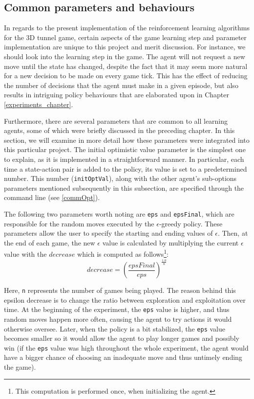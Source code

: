 \subsection{Common parameters and behaviours}
In regards to the present implementation of the reinforcement learning algorithms for the 3D tunnel game, certain aspects of the game learning step and parameter implementation are unique to this project and merit discussion. For instance, we should look into the learning step in the game. The agent will not request a new move until the state has changed, despite the fact that it may seem more natural for a new decision to be made on every game tick. This has the effect of reducing the number of decisions that the agent must make in a given episode, but also results in intriguing policy behaviours that are elaborated upon in Chapter \ref{experiments_chapter}.

Furthermore, there are several parameters that are common to all learning agents, some of which were briefly discussed in the preceding chapter. In this section, we will examine in more detail how these parameters were integrated into this particular project. The initial optimistic value parameter is the simplest one to explain, as it is implemented in a straightforward manner. In particular, each time a state-action pair is added to the policy, its value is set to a predetermined number. This number (\texttt{initOptVal}), along with the other agent's sub-options parameters mentioned subsequently in this subsection, are specified through the command line (see \ref{commOpt}).

The following two parameters worth noting are \texttt{eps} and \texttt{epsFinal}, which are responsible for the random moves executed by the $\epsilon$-greedy policy. These parameters allow the user to specify the starting and ending values of $\epsilon$. Then, at the end of each game, the new $\epsilon$ value is calculated by multiplying the current $\epsilon$ value with the $decrease$ which is computed as follows\footnote{This computation is performed once, when initializing the agent.}: $$decrease = (\frac{epsFinal}{eps})^{\frac{1.0}{n}}$$

Here, \texttt{n} represents the number of games being played. The reason behind this epsilon decrease is to change the ratio between exploration and exploitation over time. At the beginning of the experiment, the \texttt{eps} value is higher, and thus random moves happen more often, causing the agent to try actions it would otherwise oversee. Later, when the policy is a bit stabilized, the \texttt{eps} value becomes smaller so it would allow the agent to play longer games and possibly win (if the \texttt{eps} value was high throughout the whole experiment, the agent would have a bigger chance of choosing an inadequate move and thus untimely ending the game).

